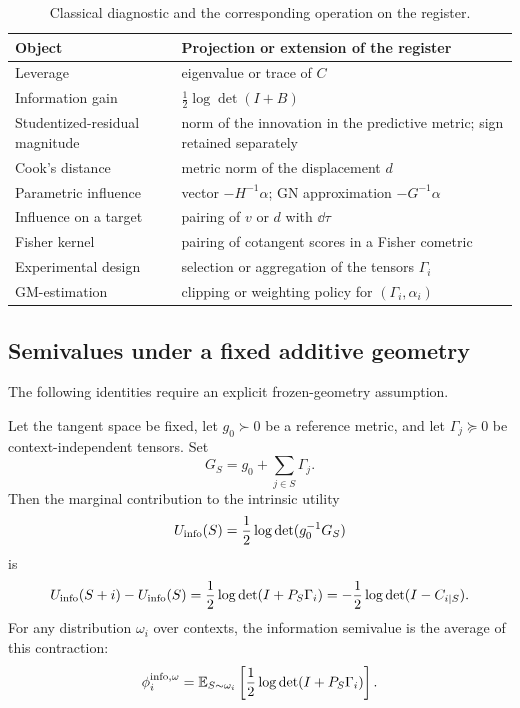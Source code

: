 \begin{table}[H]
\centering
\caption{Classical diagnostic and the corresponding operation on the register.}
\small
\begin{tabularx}{\textwidth}{@{}p{}X@{}}
\toprule
Object & Projection or extension of the register \\
\midrule
Leverage & eigenvalue or trace of $C$ \\
Information gain & $\tfrac12\log\det(I+B)$ \\
Studentized-residual magnitude & norm of the innovation in the predictive metric; sign retained separately \\
Cook's distance & metric norm of the displacement $d$ \\
Parametric influence & vector $-H^{-1}\alpha$; GN approximation $-G^{-1}\alpha$ \\
Influence on a target & pairing of $v$ or $d$ with $\dd\tau$ \\
Fisher kernel & pairing of cotangent scores in a Fisher cometric \\
Experimental design & selection or aggregation of the tensors $\Gamma_i$ \\
GM-estimation & clipping or weighting policy for $(\Gamma_i,\alpha_i)$ \\
\bottomrule
\end{tabularx}
\end{table}

\subsection{Semivalues under a fixed additive geometry}
The following identities require an explicit frozen-geometry assumption.

\begin{proposition}
Let the tangent space be fixed, let $g_0\succ0$ be a reference metric, and let $\Gamma_j\succeq0$ be context-independent tensors. Set
\[
G_S=g_0+\sum_{j\in S}\Gamma_j.
\]
Then the marginal contribution to the intrinsic utility
\[
U_{\rm info}(S)=\frac12\log\det(g_0^{-1}G_S)
\]
is
\begin{equation}
U_{\rm info}(S+i)-U_{\rm info}(S)
=
\frac12\log\det(I+P_S\Gamma_i)
=
-\frac12\log\det(I-C_{i\mid S}).
\label{eq:static-info-factor}
\end{equation}
For any distribution $\omega_i$ over contexts, the information semivalue is the average of this contraction:
\begin{equation}
\phi_i^{\rm info,\omega}
=
\mathbb{E}_{S\sim\omega_i}\left[\frac12\log\det(I+P_S\Gamma_i)\right].
\label{eq:semivalue-info}
\end{equation}
\end{proposition}

